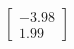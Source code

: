 \documentclass[preview]{standalone}
\begin{document}
\begin{align*}
\begin{bmatrix} -3.98 \\ 1.99 \end{bmatrix}
\end{align*}
\end{document}
